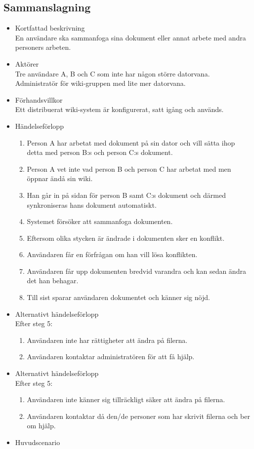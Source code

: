 \subsection{Sammanslagning}
\begin{itemize}
	\item Kortfattad beskrivning
	\\En användare ska sammanfoga sina dokument eller annat arbete med andra personers arbeten.
	\item Aktörer
	\\Tre användare A, B och C som inte har någon större datorvana.
	\\Administratör för wiki-gruppen med lite mer datorvana.	
	\item Förhandsvillkor
	\\Ett distribuerat wiki-system är konfigurerat, satt igång och används.
	\item Händelseförlopp
	\begin{enumerate}
		\item Person A har arbetat med dokument på sin dator och vill sätta ihop detta med person B:s och person C:s dokument.
		\item Person A vet inte vad person B och person C har arbetat med men öppnar ändå sin wiki.
		\item Han går in på sidan för person B samt C:s dokument och därmed synkroniseras hans dokument automatiskt.
		\item Systemet försöker att sammanfoga dokumenten.
		\item Eftersom olika stycken är ändrade i dokumenten sker en konflikt.
		\item Användaren får en förfrågan om han vill lösa konflikten.
		\item Användaren får upp dokumenten bredvid varandra och kan sedan ändra det han behagar.
		\item Till sist sparar användaren dokumentet och känner sig nöjd.
	\end{enumerate}
	\item Alternativt händelseförlopp
	\\Efter steg 5:
	\begin{enumerate}	
		\item Användaren inte har rättigheter att ändra på filerna.
		\item Användaren kontaktar administratören för att få hjälp.
	\end{enumerate}	
	\item Alternativt händelseförlopp
	\\Efter steg 5: 
	\begin{enumerate}	
		\item Användaren inte känner sig tillräckligt säker att ändra på filerna.
		\item Användaren kontaktar då den/de personer som har skrivit filerna och ber om hjälp.
	\end{enumerate}
	\item Huvudscenario
	

\end{itemize}
